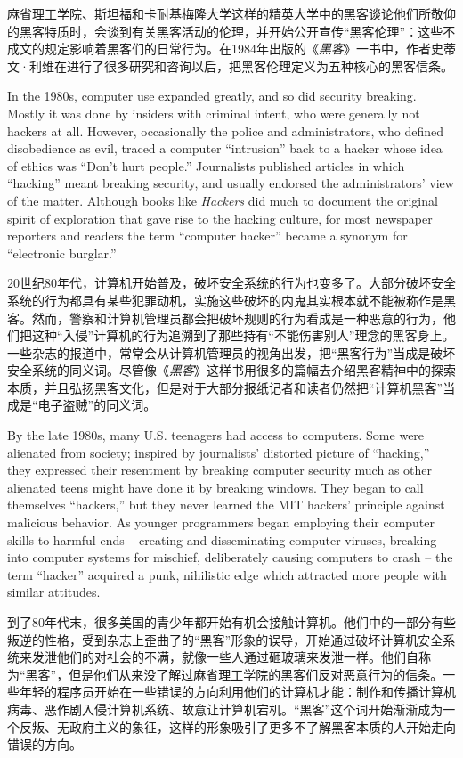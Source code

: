 \ifdefined\chs
麻省理工学院、斯坦福和卡耐基梅隆大学这样的精英大学中的黑客谈论他们所敬仰的黑客特质时，会谈到有关黑客活动的伦理，并开始公开宣传“黑客伦理”：这些不成文的规定影响着黑客们的日常行为。在1984年出版的《\textit{黑客}》一书中，作者史蒂文·利维在进行了很多研究和咨询以后，把黑客伦理定义为五种核心的黑客信条。
\fi

\ifdefined\eng
In the 1980s, computer use expanded greatly, and so did security breaking.  Mostly it was done by insiders with criminal intent, who were generally not hackers at all.  However, occasionally the police and administrators, who defined disobedience as evil, traced a computer ``intrusion'' back to a hacker whose idea of ethics was ``Don't hurt people.''   Journalists published articles in which ``hacking'' meant breaking security, and usually endorsed the administrators' view of the matter.  Although books like \textit{Hackers} did much to document the original spirit of exploration that gave rise to the hacking culture, for most newspaper reporters and readers the term ``computer hacker'' became a synonym for ``electronic burglar.''
\fi

\ifdefined\chs
20世纪80年代，计算机开始普及，破坏安全系统的行为也变多了。大部分破坏安全系统的行为都具有某些犯罪动机，实施这些破坏的内鬼其实根本就不能被称作是黑客。然而，警察和计算机管理员都会把破坏规则的行为看成是一种恶意的行为，他们把这种“入侵”计算机的行为追溯到了那些持有“不能伤害别人”理念的黑客身上。一些杂志的报道中，常常会从计算机管理员的视角出发，把“黑客行为”当成是破坏安全系统的同义词。尽管像《\textit{黑客}》这样书用很多的篇幅去介绍黑客精神中的探索本质，并且弘扬黑客文化，但是对于大部分报纸记者和读者仍然把“计算机黑客”当成是“电子盗贼”的同义词。
\fi

\ifdefined\eng
By the late 1980s, many U.S. teenagers had access to computers.  Some were alienated from society; inspired by journalists' distorted picture of ``hacking,'' they expressed their resentment by breaking computer security much as other alienated teens might have done it by breaking windows. They began to call themselves ``hackers,'' but they never learned the MIT hackers' principle against malicious behavior. As younger programmers began employing their computer skills to harmful ends -- creating and disseminating computer viruses, breaking into computer systems for mischief, deliberately causing computers to crash -- the term ``hacker'' acquired a punk, nihilistic edge which attracted more people with similar attitudes.
\fi

\ifdefined\chs
到了80年代末，很多美国的青少年都开始有机会接触计算机。他们中的一部分有些叛逆的性格，受到杂志上歪曲了的“黑客”形象的误导，开始通过破坏计算机安全系统来发泄他们的对社会的不满，就像一些人通过砸玻璃来发泄一样。他们自称为“黑客”，但是他们从来没了解过麻省理工学院的黑客们反对恶意行为的信条。一些年轻的程序员开始在一些错误的方向利用他们的计算机才能：制作和传播计算机病毒、恶作剧入侵计算机系统、故意让计算机宕机。“黑客”这个词开始渐渐成为一个反叛、无政府主义的象征，这样的形象吸引了更多不了解黑客本质的人开始走向错误的方向。
\fi

